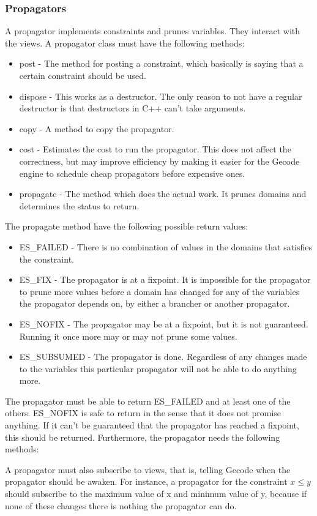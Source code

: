\documentclass[a4paper,11pt]{article}
\begin{document}
\subsubsection{Propagators}
A propagator implements constraints and prunes variables. They interact with the views. A propagator class must have the following methods:
\begin{itemize}
\item{post} - The method for posting a constraint, which basically is saying that a certain constraint should be used.
\item{dispose} - This works as a destructor. The only reason to not have a regular destructor is that destructors in C++ can't take arguments.
\item{copy} - A method to copy the propagator.
\item{cost} - Estimates the cost to run the propagator. This does not affect the correctness, but may improve efficiency by making it easier for the Gecode engine to schedule cheap propagators before expensive ones.
\item{propagate} - The method which does the actual work. It prunes domains and determines the status to return.
\end{itemize}
The propagate method have the following possible return values:
\begin{itemize}
\item{ES\_FAILED} - There is no combination of values in the domains that satisfies the constraint. 
\item{ES\_FIX} - The propagator is at a fixpoint. It is impossible for the propagator to prune more values before a domain has changed for any of the variables the propagator depends on, by either a brancher or another propagator.
\item{ES\_NOFIX} - The propagator may be at a fixpoint, but it is not guaranteed. Running it once more may or may not prune some values. 
\item{ES\_SUBSUMED} - The propagator is done. Regardless of any changes made to the variables this particular propagator will not be able to do anything more.
\end{itemize}
The propagator must be able to return ES\_FAILED and at least one of the others. ES\_NOFIX is safe to return in the sense that it does not promise anything. If it can't be guaranteed that the propagator has reached a fixpoint, this should be returned. Furthermore, the propagator needs the following methods:

A propagator must also subscribe to views, that is, telling Gecode when the propagator should be awaken. For instance, a propagator for the constraint $x\le y$ should subscribe to the maximum value of x and minimum value of y, because if none of these changes there is nothing the propagator can do.
\end{document}

